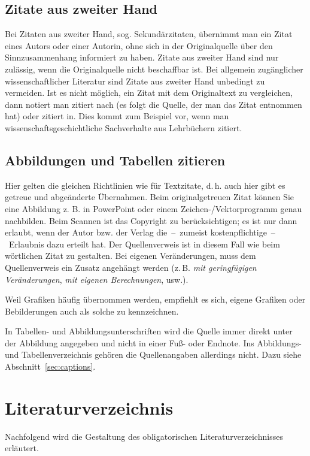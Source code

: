 \subsection{Zitate aus zweiter Hand}
Bei Zitaten aus zweiter Hand, sog. Sekundärzitaten, übernimmt man ein Zitat eines Autors oder einer Autorin, ohne sich in der Originalquelle über den Sinnzusammenhang informiert zu haben. Zitate aus zweiter Hand sind nur zulässig, wenn die Originalquelle nicht beschaffbar ist. Bei allgemein zugänglicher wissenschaftlicher Literatur sind Zitate aus zweiter Hand unbedingt zu vermeiden. Ist es nicht möglich, ein Zitat mit dem Originaltext zu vergleichen, dann notiert man zitiert nach (es folgt die Quelle, der man das Zitat entnommen hat) oder zitiert in. Dies kommt zum Beispiel vor, wenn man wissenschaftsgeschichtliche Sachverhalte aus Lehrbüchern zitiert.
%
\subsection{Abbildungen und Tabellen zitieren}
\label{sec:refFigures}
Hier gelten die gleichen Richtlinien wie für Textzitate, d.\,h. auch hier gibt es getreue und abgeänderte Übernahmen. Beim originalgetreuen Zitat können Sie eine Abbildung z. B. in PowerPoint oder einem Zeichen-/Vektorprogramm genau nachbilden. Beim Scannen ist das Copyright zu berücksichtigen; es ist nur dann erlaubt, wenn der Autor bzw. der Verlag die~--~zumeist kostenpflichtige~--~Erlaubnis dazu erteilt hat. Der Quellenverweis ist in diesem Fall wie beim wörtlichen Zitat zu gestalten. Bei eigenen Veränderungen, muss dem Quellenverweis ein Zusatz angehängt werden (z.\,B. \emph{mit geringfügigen Veränderungen}, \emph{mit eigenen Berechnungen}, usw.).
\par
Weil Grafiken häufig übernommen werden, empfiehlt es sich, eigene Grafiken oder Bebilderungen auch als solche zu kennzeichnen.
\par
In Tabellen- und Abbildungsunterschriften wird die Quelle immer direkt unter der Abbildung angegeben und nicht in einer Fuß- oder Endnote. Ins Abbildungs- und Tabellenverzeichnis gehören die Quellenangaben allerdings nicht. Dazu siehe Abschnitt~\ref{sec:captions}.
%
%
\section{Literaturverzeichnis}
%
Nachfolgend wird die Gestaltung des obligatorischen Literaturverzeichnisses erläutert.
%

